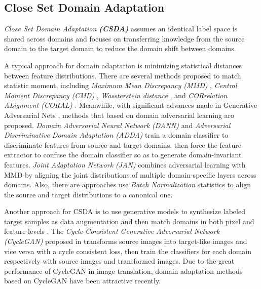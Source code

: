 \subsection{Close Set Domain Adaptation}
\textit{Close Set Domain Adaptation \textbf{(CSDA)}} assumes an identical label space is shared across domains and focuses on transferring knowledge from the source domain to the target domain to reduce the domain shift between domains. 

A typical approach for domain adaptation is minimizing statistical distances between feature distributions. 
There are several methods proposed to match statistic moment, including 
\textit{Maximum Mean Discrepancy (MMD)} \cite{DeepDomainConfusion,long2016unsupervised,long2017deep,DeepAdaptationNetworks,Elsevier-UDAFeature}, 
\textit{Central Moment Discrepancy (CMD)} \cite{zellinger2017central,pan2016domain}, 
\textit{Wassterstein distance} \cite{courty2016optimal}, 
and \textit{CORrelation ALignment (CORAL)} \cite{DeepCoral}. 
Meanwhile, with significant advances made in Generative Adversarial Nets \cite{goodfellow2014generative}, methods that based on domain adversarial learning aro proposed. \textit{Domain Adversarial Neural Network (DANN)} \cite{DomainAdversrialNetwork} and \textit{Adversarial Discriminative Domain Adaptation (ADDA)}  train a domain classifier to discriminate features from source and target domains, then force the feature extractor to confuse the domain classifier so as to generate domain-invariant features. 
\textit{Joint Adaptation Network (JAN)} combines adversarial learning with MMD by aligning the joint distributions of multiple domain-specific layers across domains. 
Also, there are approaches use \textit{Batch Normalization} statistics \cite{li2016revisiting,cariucci2017autodial} to align the source and target distributions to a canonical one. 

Another approach for CSDA is to use generative models to synthesize labeled target samples as data augmentation and then match domains in both pixel and feature levels \cite{bousmalis2017unsupervised,wang2018high,creswell2018generative,Elsevier-SBADAGAN,xiao2018semantic}. 
The \textit{Cycle-Consistent Generative Adversarial Network (CycleGAN)} proposed in \cite{li2018unsupervised} transforms source images into target-like images and vice versa with a cycle consistent loss, then train the classifiers for each domain respectively with source images and transformed images. 
Due to the great performance of CycleGAN in image translation, domain adaptation methods based on CycleGAN \cite{russo2018source,hoffman2017cycada} have been attractive recently. 

